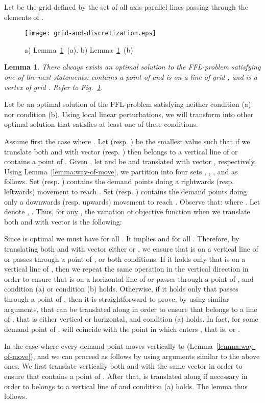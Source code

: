 \documentclass[11pt,a4paper,oneside,onecolumn]{article}
\newtheorem{lemma}[theorem]{Lemma}
\def\QED{\ensuremath{{\square}}}
\def\markatright#1{\leavevmode\unskip\nobreak\quad\hspace*{\fill}{#1}}
\newenvironment{proof}
{\begin{trivlist}\item[\hskip\labelsep{\bf Proof.}]}
{\markatright{\QED}\end{trivlist}}
\begin{document}
Let  be the grid defined by the set of all axis-parallel lines
passing through the elements of .
\begin{figure}[h]
  \centering
  \texttt{[image: grid-and-discretization.eps]}
  \caption{\small{a) Lemma~\ref{lemma:discretization-FFL}~(a). b)
Lemma~\ref{lemma:discretization-FFL}~(b)}}
  \label{fig:grid-and-disc}
\end{figure}
\begin{lemma}\label{lemma:discretization-FFL}
There always exists an optimal solution  to the FFL-problem
satisfying one of the next statements:   contains a point of
 and  is on a line of grid , and   is a vertex of
grid . Refer to Fig.~\ref{fig:grid-and-disc}.
\end{lemma}
\begin{proof}
Let  be an optimal solution of the FFL-problem satisfying
neither condition (a) nor condition (b). Using local linear
perturbations, we will transform  into other optimal solution
that satisfies at least one of these conditions.

Assume first the case where . Let
 (resp. ) be the smallest value such
that if we translate both  and  with vector 
(resp. ) then  belongs to a vertical line of  or
 contains a point of . Given ,
let  and  be  and  translated with vector
, respectively. Using Lemma~\ref{lemma:way-of-move}, we
partition  into four sets , , , and  as
follows. Set  (resp. ) contains the demand points doing a
rightwards (resp. leftwards) movement to reach . Set  (resp.
) contains the demand points doing only a downwards (resp.
upwards) movement to reach . Observe that:
 where .
Let  denote , . Thus, for any
, the variation of objective function
when we translate both  and  with vector  is the
following:

Since  is optimal we must have
 for all
. It implies
 and
 for all
. Therefore, by translating both 
and  with vector either  or , we
ensure that  is on a vertical line of  or  passes through a
point of , or both conditions. If it holds only that  is on a
vertical line of , then we repeat the same operation in the
vertical direction in order to ensure that  is on a horizontal
line of  or  passes through a point of , and condition (a)
or condition (b) holds. Otherwise, if it holds only that  passes
through a point of , then it is straightforward to prove, by
using similar arguments, that  can be translated along  in
order to ensure that  belongs to a line of , that is either vertical or
horizontal, and condition (a) holds. In fact, for some demand point
 of ,  will coincide with the point in which  enters
, that is,  or .

In the case where  every demand point 
moves vertically to  (Lemma~\ref{lemma:way-of-move}), and we can
proceed as follows by using arguments similar to the above ones. We
first translate vertically both  and  with the same vector in
order to ensure that  contains a point of . After that,  is
translated along  if necessary in order to  belongs to a
vertical line of  and condition (a) holds. The lemma thus
follows.
\end{proof}
\end{document}
